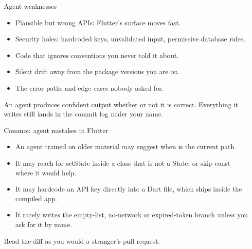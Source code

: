 \documentclass[10pt,aspectratio=169,t]{beamer}
\begin{document}
\begin{frame}[eyebrow=Agents]{Agent weaknesses}
  \vskip 2mm
  \begin{itemize}
    \item Plausible but wrong APIs: Flutter's surface moves fast.
    \item Security holes: hardcoded keys, unvalidated input, permissive database rules.
    \item Code that ignores conventions you never told it about.
    \item Silent drift away from the package versions you are on.
    \item The error paths and edge cases nobody asked for.
  \end{itemize}
  \begin{takeaway}{An agent produces confident output whether or not it is correct.}
    Everything it writes still lands in the commit log under your name.
  \end{takeaway}
\end{frame}

\begin{frame}[eyebrow=Agents]{Common agent mistakes in Flutter}
  \vskip 2mm
  \begin{itemize}
    \item An agent trained on older material may suggest  when  is the current path. 
    \item It may reach for setState inside a class that is not a State, or skip const where it would help.
    \item It may hardcode an API key directly into a Dart file, which ships inside the compiled app. 
    \item It rarely writes the empty-list, no-network or expired-token branch unless you ask for it by name.
  \end{itemize}
  \begin{takeaway}{Read the diff as you would a stranger's pull request.}
  \end{takeaway}
\end{frame}
\end{document}
